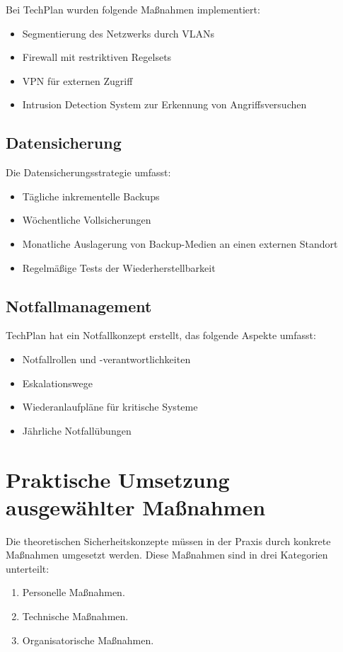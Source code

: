 \documentclass{orgstandard}
\begin{document}
Bei TechPlan wurden folgende Maßnahmen implementiert:
\begin{itemize}
\item Segmentierung des Netzwerks durch VLANs
\item Firewall mit restriktiven Regelsets
\item VPN für externen Zugriff
\item Intrusion Detection System zur Erkennung von Angriffsversuchen
\end{itemize}

\subsection{Datensicherung}
\label{sec:org6e7ba25}

Die Datensicherungsstrategie umfasst:
\begin{itemize}
\item Tägliche inkrementelle Backups
\item Wöchentliche Vollsicherungen
\item Monatliche Auslagerung von Backup-Medien an einen externen Standort
\item Regelmäßige Tests der Wiederherstellbarkeit
\end{itemize}

\subsection{Notfallmanagement}
\label{sec:orgb985bda}

TechPlan hat ein Notfallkonzept erstellt, das folgende Aspekte umfasst:
\begin{itemize}
\item Notfallrollen und -verantwortlichkeiten
\item Eskalationswege
\item Wiederanlaufpläne für kritische Systeme
\item Jährliche Notfallübungen
\end{itemize}

\section{Praktische Umsetzung ausgewählter Maßnahmen}
\label{sec:org918bccf}

Die theoretischen Sicherheitskonzepte müssen in der Praxis durch konkrete Maßnahmen umgesetzt werden. Diese Maßnahmen sind in drei Kategorien unterteilt:
\begin{enumerate}
\item Personelle Maßnahmen.
\item Technische Maßnahmen.
\item Organisatorische Maßnahmen.
\end{enumerate}
\end{document}
